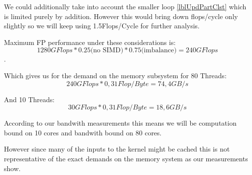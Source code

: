 We could additionally take into account the smaller loop \autoref{lblUpdPartClst} which is limited purely by addition.
However this would bring down flops/cycle only slightly so we will keep using 1.5Flops/Cycle for further analysis.

Maximum FP performance under these considerations is:
$$1280 GFlops * 0.25 \text{(no SIMD)}  * 0.75 \text{(imbalance)} = 240 GFlops$$.

Which gives us for the demand on the memory subsystem for 80 Threads:
$${240 GFlops}*{0,31 Flop/Byte} = 74,4 GB/s$$

And 10 Threads:
$${30 GFlops}*{0,31 Flop/Byte} = 18,6 GB/s$$

According to our bandwith measurements this means we will be computation bound on 10 cores and bandwith bound on 80 cores.

However since many of the inputs to the kernel might be cached this is not representative of the exact demands on the memory system as our measurements show.



